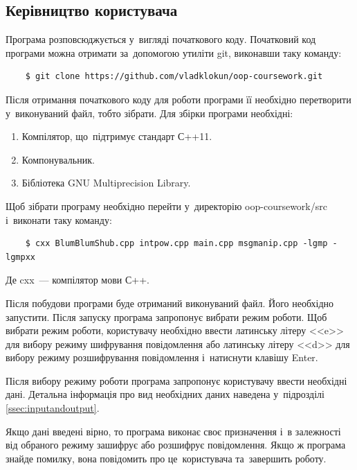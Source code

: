 \documentclass[a4paper,oneside,titlepage,14pt]{extarticle}
\begin{document}
		\subsection{Керівництво користувача}
			\label{ssec:usersguide}
			Програма розповсюджується у~вигляді початкового коду. Початковий код програми можна отримати за~допомогою утиліти git, виконавши таку команду: \par
			\begin{verbatim}
	$ git clone https://github.com/vladklokun/oop-coursework.git
			\end{verbatim}
			Після отримання початкового коду для роботи програми її необхідно перетворити у~виконуваний файл, тобто зібрати. Для збірки програми необхідні:
			\begin{enumerate}
				\item Компілятор, що~підтримує стандарт С++11.
				\item Компонувальник.
				\item Бібліотека GNU Multiprecision Library.
			\end{enumerate} \par
			Щоб зібрати програму необхідно перейти у~директорію oop-course\-work/src і~виконати таку команду:
			\begin{verbatim}
	$ cxx BlumBlumShub.cpp intpow.cpp main.cpp msgmanip.cpp -lgmp -lgmpxx
			\end{verbatim}
			\par
			Де cxx~--- компілятор мови С++.\par
			Після побудови програми буде отриманий виконуваний файл. Його необхідно запустити. Після запуску програма запропонує вибрати режим роботи. Щоб вибрати режим роботи, користувачу необхідно ввести латинську літеру <<e>> для вибору режиму шифрування повідомлення або латинську літеру <<d>> для вибору режиму розшифрування повідомлення і~натиснути клавішу Enter.\par
			Після вибору режиму роботи програма запропонує користувачу ввести необхідні дані. Детальна інформація про вид необхідних даних наведена у~підрозділі \ref{ssec:inputandoutput}.\par
			Якщо дані введені вірно, то програма виконає своє призначення і~в залежності від обраного режиму зашифрує або розшифрує повідомлення. Якщо ж програма знайде помилку, вона повідомить про це~користувача та~завершить роботу.\par
	\newpage
\end{document}

